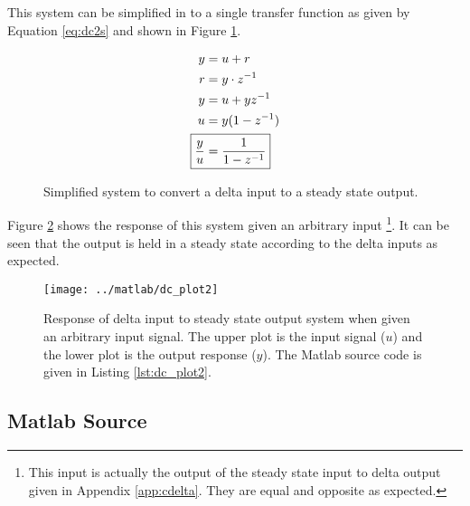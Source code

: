\documentclass{article}
\begin{document}
This system can be simplified in to a single transfer function
as given by Equation \ref{eq:dc2s} and shown in Figure \ref{fig:dc1s}.

\begin{align}
	y &= u + r \notag \\
	r &= y \cdot z^{-1} \notag \\
	y &= u + y z^{-1} \notag \\
	u &= y(1 - z^{-1}) \notag \\
	\Aboxed{ \frac{y}{u} &= \frac{1}{1 - z^{-1}} } \label{eq:dc2s}
\end{align}

\begin{figure}[!htbp]
\begin{center}


\end{center}
\caption{Simplified system to convert a delta input to
a steady state output.}
\label{fig:dc1s}
\end{figure}

Figure \ref{fig:dc_plot2} shows the response of this system given
an arbitrary input
\footnote{This input is actually the output of the steady state input
to delta output given in Appendix \ref{app:cdelta}.
They are equal and opposite as expected.}.
It can be seen that the output is held in a steady state according
to the delta inputs as expected.

\begin{figure}[htbp!]
\texttt{[image: ../matlab/dc\_plot2]}
\caption{Response of delta input to steady state output system
when given an arbitrary input signal.
The upper plot is the input signal ($u$) and the lower plot is
the output response ($y$).
The Matlab source code is given in Listing \ref{lst:dc_plot2}.
}
\label{fig:dc_plot2}
\end{figure}

\clearpage
\subsection{Matlab Source}
\label{app:dcsrc}

\nocite{octave}
\end{document}
